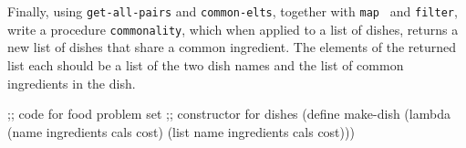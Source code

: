 Finally, using {\tt get-all-pairs} and {\tt common-elts}, together with
{\tt map } and {\tt filter}, write a procedure {\tt commonality}, which
when applied to a list of dishes, returns a new list of dishes that
share a common ingredient.  The elements of the returned list each
should be a list of the two dish names and the list of common ingredients
in the dish.

\vfill
\eject
\beginlisp
;; code for food problem set 
\pbrk
;; constructor for dishes
\pbrk
(define make-dish
  (lambda (name ingredients cals cost)
    (list name ingredients cals cost)))
\pbrk

